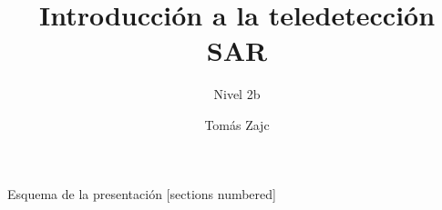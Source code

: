 \documentclass[handout,aspectratio=169]{beamer}
\title{Introducción a la teledetección SAR}
\subtitle{Nivel 2b}
\author{Tomás Zajc}
\institute{SAOCOM \\ Comisión Nacional de Actividades Espaciales}
\date{}
\begin{document}
\maketitle

\begin{frame}{Esquema de la presentación}
  [sections numbered]
  \tableofcontents[hideallsubsections]
\end{frame}






\end{document}

